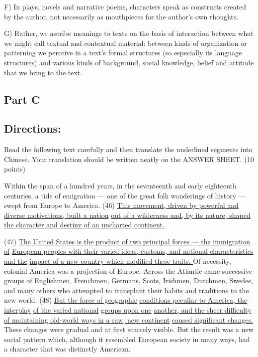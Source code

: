 \documentclass[UTF8,11pt]{ctexart}
\begin{document}
F) In plays, novels and narrative poems, characters speak as constructs created by the author, not necessarily as mouthpieces for the author’s own thoughts.


G) Rather, we ascribe meanings to texts on the basis of interaction between what we might call textual and contextual material: between kinds of organization or patterning we perceive in a text’s formal structures (so especially its language structures) and various kinds of background, social knowledge, belief and attitude that we bring to the text.


\subsection*{\textbf{Part C}}


\subsection*{\textbf{Directions:}}


Read the following text carefully and then translate the underlined segments into Chinese. Your translation should be written neatly on the ANSWER SHEET. (10 points)


Within the span of a hundred years, in the seventeenth and early eighteenth centuries, a tide of emigration — one of the great folk wanderings of history — swept from Europe to America. (46) \uline{This movement, driven by powerful and diverse motivations, built a nation} \uline{out of a wilderness and, by its nature, shaped the character and destiny of an uncharted} \uline{continent.}


(47) \uline{The United States is the product of two principal forces — the immigration of} \uline{European peoples with their varied ideas, customs, and national characteristics and the} \uline{impact of a new country which modified these traits. }Of necessity, colonial America was a projection of Europe. Across the Atlantic came successive groups of Englishmen, Frenchmen, Germans, Scots, Irishmen, Dutchmen, Swedes, and many others who attempted to transplant their habits and traditions to the new world. (48) \uline{But the force of geographic} \uline{conditions peculiar to America, the interplay} \uline{of the varied national} \uline{groups upon one} \uline{another, and the sheer difficulty of maintaining old-world ways in a raw, new continent} \uline{caused significant changes. }These changes were gradual and at first scarcely visible. But the result was a new social pattern which, although it resembled European society in many ways, had a character that was distinctly American.
\end{document}
